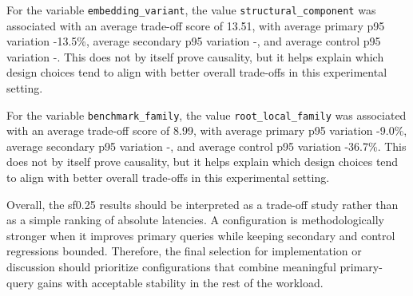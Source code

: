 For the variable \texttt{embedding\_variant}, the value \texttt{structural\_component} was associated with an average trade-off score of 13.51, with average primary p95 variation -13.5\%, average secondary p95 variation -, and average control p95 variation -. This does not by itself prove causality, but it helps explain which design choices tend to align with better overall trade-offs in this experimental setting.

For the variable \texttt{benchmark\_family}, the value \texttt{root\_local\_family} was associated with an average trade-off score of 8.99, with average primary p95 variation -9.0\%, average secondary p95 variation -, and average control p95 variation -36.7\%. This does not by itself prove causality, but it helps explain which design choices tend to align with better overall trade-offs in this experimental setting.

Overall, the sf0.25 results should be interpreted as a trade-off study rather than as a simple ranking of absolute latencies. 
A configuration is methodologically stronger when it improves primary queries while keeping secondary and control regressions bounded. 
Therefore, the final selection for implementation or discussion should prioritize configurations that combine meaningful primary-query gains with acceptable stability in the rest of the workload.
